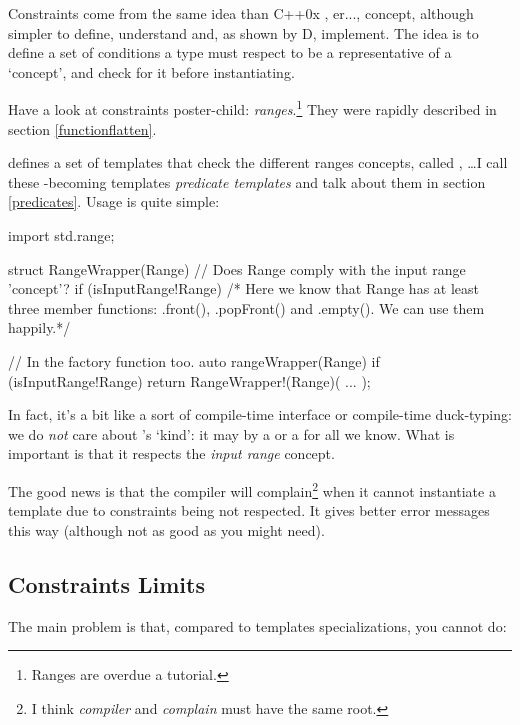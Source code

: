 Constraints come from the same idea than C++0x , er..., concept, although simpler to define, understand and, as shown by D, implement. The idea is to define a set of conditions a type must respect to be a representative of a `concept', and check for it before instantiating.

Have a look at constraints poster-child: \emph{ranges}.\footnote{ Ranges are overdue a tutorial.} They were rapidly described in section \ref{functionflatten}.

 defines a set of templates that check the different ranges concepts, called , \ldots I call these -becoming templates \emph{predicate templates} and talk about them in section \ref{predicates}. Usage is quite simple:

\begin{dcode}
import std.range;

struct RangeWrapper(Range) 
    // Does Range comply with the input range 'concept'?
    if (isInputRange!Range) 
{ 
   /* Here we know that Range has at least three member functions:
      .front(), .popFront() and .empty(). We can use them happily.*/
}

// In the factory function too.
auto rangeWrapper(Range) if (isInputRange!Range) 
{
    return RangeWrapper!(Range)( ... );
}
\end{dcode}

In fact, it's a bit like a sort of compile-time interface or compile-time duck-typing: we do \emph{not} care about 's `kind': it may by a  or a  for all we know. What is important is that it respects the \emph{input range} concept.

The good news is that the compiler will complain\footnote{ I think \emph{compiler} and \emph{complain} must have the same root.} when it cannot instantiate a template due to constraints being not respected. It gives better error messages this way (although not as good as you might need).

\subsection{Constraints Limits}\label{constraintslimits}

The main problem is that, compared to templates specializations, you cannot do:

